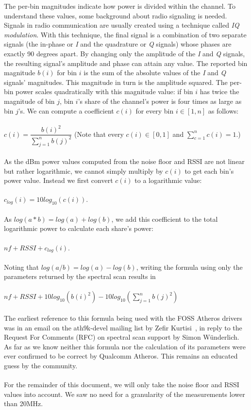 \documentclass[a4paper, 11pt]{article}
\begin{document}
The per-bin magnitudes indicate how power is divided within the channel. To understand these values, some background about radio signaling is needed. Signals in radio communication are usually created using a technique called \textit{IQ modulation}. With this technique, the final signal is a combination of two separate signals (the in-phase or \textit{I} and the quadrature or \textit{Q} signals) whose phases are exactly 90 degrees apart. By changing only the amplitude of the \textit{I} and \textit{Q} signals, the resulting signal's amplitude and phase can attain any value. The reported bin magnitude $b(i)$ for bin $i$ is the sum of the absolute values of the \textit{I} and \textit{Q} signals' magnitudes. This magnitude in turn is the amplitude squared. The per-bin power scales quadratically with this magnitude value: if bin $i$ has twice the magnitude of bin $j$, bin $i$'s share of the channel's power is four times as large as bin $j$'s. We can compute a coefficient $c(i)$ for every bin $i \in [1,n]$ as follows:\\\\\hspace*{1.5em}$c(i) = \dfrac{b(i)^2}{\sum\limits_{j=1}^{n}b(j)^2}$ (Note that every $c(i) \in [0,1]$ and $\sum\limits_{c=1}^{n}{c(i)} = 1$.) \\\\
As the dBm power values computed from the noise floor and RSSI are not linear but rather logarithmic, we cannot simply multiply by $c(i)$ to get each bin's power value. Instead we first convert $c(i)$ to a logarithmic value: \\ \\ $c_{log}(i) = 10 log_{10}(c(i))$. \\ \\ As $log(a*b) = log(a) + log(b)$, we add this coefficient to the total logarithmic power to calculate each share's power:\\ \\ $nf + RSSI + c_{log}(i)$.\\ \\ Noting that $log(a/b) = log(a) - log(b)$, writing the formula using only the parameters returned by the spectral scan results in\\ \\ $nf + RSSI  + 10 log_{10}(b(i)^2) - 10 log_{10}(\sum\limits_{j=1}^{n}{b(j)^2})$ \\ \\
The earliest reference to this formula being used with the FOSS Atheros drivers was in an email on the ath9k-devel mailing list by Zefir Kurtisi~\cite{formula}, in reply to the Request For Comments (RFC) on spectral scan support by Simon W{\"u}nderlich. As far as we know neither this formula nor the calculation of its parameters were ever confirmed to be correct by Qualcomm Atheros. This remains an educated guess by the community. \\ \\
For the remainder of this document, we will only take the noise floor and RSSI values into account. We saw no need for a granularity of the measurements lower than 20MHz.
\end{document}
